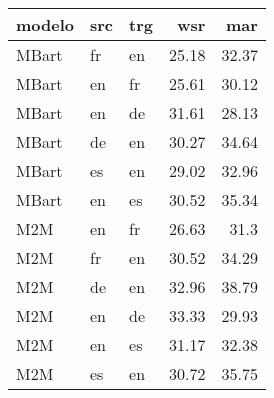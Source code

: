 \begin{tabular}{lllrr}
\hline
 modelo   & src   & trg   &   wsr &   mar \\
\hline
 MBart    & fr    & en    & 25.18 & 32.37 \\
 MBart    & en    & fr    & 25.61 & 30.12 \\
 MBart    & en    & de    & 31.61 & 28.13 \\
 MBart    & de    & en    & 30.27 & 34.64 \\
 MBart    & es    & en    & 29.02 & 32.96 \\
 MBart    & en    & es    & 30.52 & 35.34 \\
 M2M      & en    & fr    & 26.63 & 31.3  \\
 M2M      & fr    & en    & 30.52 & 34.29 \\
 M2M      & de    & en    & 32.96 & 38.79 \\
 M2M      & en    & de    & 33.33 & 29.93 \\
 M2M      & en    & es    & 31.17 & 32.38 \\
 M2M      & es    & en    & 30.72 & 35.75 \\
\hline
\end{tabular}